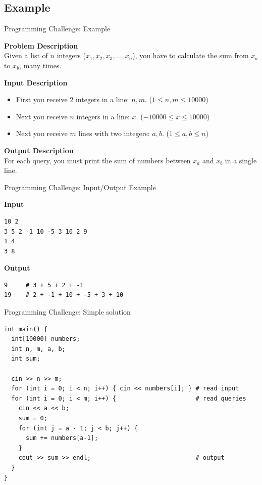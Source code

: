 \subsection{Example}
\begin{frame}{Programming Challenge: Example}

  {\bf Problem Description}\\
  Given a list of $n$ integers ($x_1, x_2, x_3, \ldots, x_n$), you have to calculate the sum from $x_a$ to $x_b$, many times.
  \medskip

  {\bf Input Description}
  \begin{itemize}
    \item First you receive 2 integers in a line: $n, m$. ($1 \leq n, m \leq 10000$)
    \item Next you receive $n$ integers in a line: $x$. ($-10000 \leq x \leq 10000$)
    \item Next you receive $m$ lines with two integers: $a, b$. ($1 \leq a,b \leq n$)
  \end{itemize}
  \medskip

  {\bf Output Description}\\
  For each query, you must print the sum of numbers between $x_a$ and $x_b$ in a single line.

\end{frame}

\begin{frame}[fragile, t]{Programming Challenge: Input/Output Example}

  {\bf Input}
\begin{verbatim}
10 2
3 5 2 -1 10 -5 3 10 2 9
1 4
3 8
\end{verbatim}
  \bigskip

  {\bf Output}
\begin{verbatim}
9     # 3 + 5 + 2 + -1
19    # 2 + -1 + 10 + -5 + 3 + 10
\end{verbatim}

\end{frame}

\begin{frame}[fragile, t]{Programming Challenge: Simple solution}

{\smaller
\begin{verbatim}
int main() {
  int[10000] numbers;
  int n, m, a, b;
  int sum;

  cin >> n >> m;
  for (int i = 0; i < n; i++) { cin << numbers[i]; } # read input
  for (int i = 0; i < m; i++) {                      # read queries
    cin << a << b; 
    sum = 0;
    for (int j = a - 1; j < b; j++) {
      sum += numbers[a-1];
    }
    cout >> sum >> endl;                             # output
  }
}
\end{verbatim}}
\end{frame}

